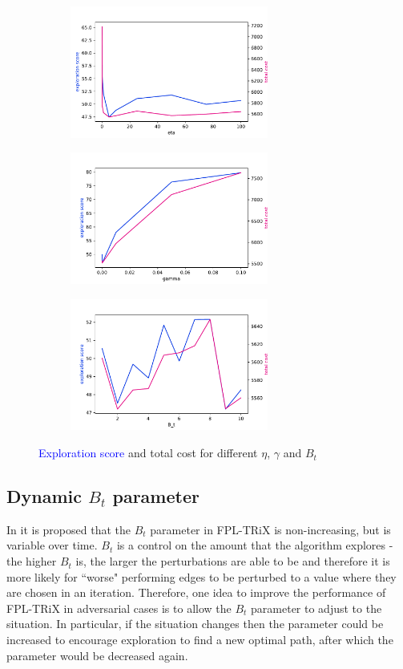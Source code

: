 \begin{figure}[ht!]
\centering
\begin{subfigure}{.5\textwidth}
  \centering
  \includegraphics[width=65mm]{../plots/eta_expl_cost.pdf}
\end{subfigure}%
\begin{subfigure}{.5\textwidth}
  \centering
  \includegraphics[width=65mm]{../plots/gamma_expl_cost.pdf}
\end{subfigure}
\begin{subfigure}{.5\textwidth}
  \centering
  \includegraphics[width=65mm]{../plots/Bt_expl_cost.pdf}
\end{subfigure}
\caption{\textcolor{blue}{Exploration score} and \textcolor{RubineRed}{total cost} for different $\eta$, $\gamma$ and $B_t$}
\label{fig:exploration_score}
\end{figure}


\subsection{Dynamic $B_t$ parameter}

In \cite{neu2015first} it is proposed that the $B_t$ parameter in FPL-TRiX is non-increasing, but is variable over time. $B_t$ is a control on the amount that the algorithm explores - the higher $B_t$ is, the larger the perturbations are able to be and therefore it is more likely for ``worse" performing edges to be perturbed to a value where they are chosen in an iteration. Therefore, one idea to improve the performance of FPL-TRiX in adversarial cases is to allow the $B_t$ parameter to adjust to the situation. In particular, if the situation changes then the parameter could be increased to encourage exploration to find a new optimal path, after which the parameter would be decreased again.\\


